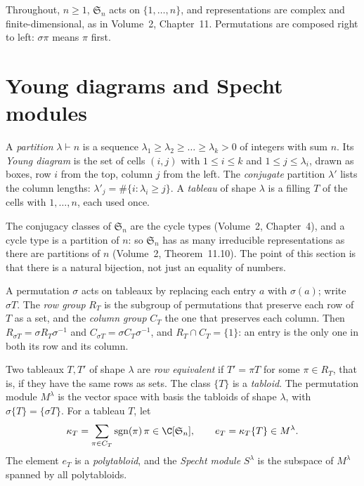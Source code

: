 Throughout, $n\ge1$, $\mathfrak S_n$ acts on $\{1,\dots,n\}$, and representations are complex and finite-dimensional, as in Volume~2, Chapter~11. Permutations are composed right to left: $\sigma\pi$ means $\pi$ first.

\section{Young diagrams and Specht modules}

\begin{definition}\label{def:partition}
A \emph{partition} $\lambda\vdash n$ is a sequence $\lambda_1\ge\lambda_2\ge\dots\ge\lambda_k>0$ of integers with sum $n$. Its \emph{Young diagram} is the set of cells $(i,j)$ with $1\le i\le k$ and $1\le j\le\lambda_i$, drawn as boxes, row $i$ from the top,
column $j$ from the left. The \emph{conjugate} partition $\lambda'$ lists the column lengths: $\lambda'_j=\#\{i:\lambda_i\ge j\}$. A \emph{tableau} of shape $\lambda$ is a filling $T$ of the cells with $1,\dots,n$, each used once.
\end{definition}

The conjugacy classes of $\mathfrak S_n$ are the cycle types (Volume~2, Chapter~4), and a cycle type is a partition of $n$: so $\mathfrak S_n$ has as many irreducible representations as there are partitions of $n$ (Volume~2, Theorem~11.10).
The point of this section is that there is a natural bijection, not just an equality of numbers.

A permutation $\sigma$ acts on tableaux by replacing each entry $a$ with $\sigma(a)$; write $\sigma T$. The \emph{row group} $R_T$ is the subgroup of permutations that preserve each row of $T$ as a set, and the \emph{column group}
$C_T$ the one that preserves each column. Then $R_{\sigma T}=\sigma R_T\sigma^{-1}$ and $C_{\sigma T}=\sigma C_T\sigma^{-1}$, and $R_T\cap C_T=\{1\}$: an entry is the only one in both its row and its column.

\begin{definition}\label{def:tabloid}
Two tableaux $T,T'$ of shape $\lambda$ are \emph{row equivalent} if $T'=\pi T$ for some $\pi\in R_T$, that is, if they have the same rows as sets. The class $\{T\}$ is a \emph{tabloid}. The permutation module $M^\lambda$ is the
vector space with basis the tabloids of shape $\lambda$, with $\sigma\{T\}=\{\sigma T\}$. For a tableau $T$, let
\[
\kappa_T=\sum_{\pi\in C_T}\operatorname{sgn}(\pi)\,\pi\in\C[\mathfrak S_n],\qquad e_T=\kappa_T\{T\}\in M^\lambda.
\]
The element $e_T$ is a \emph{polytabloid}, and the \emph{Specht module} $S^\lambda$ is the subspace of $M^\lambda$ spanned by all polytabloids.
\end{definition}

